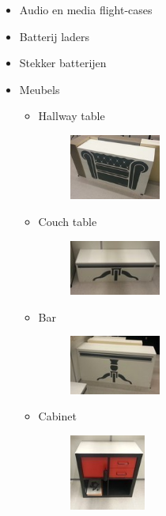 \documentclass[a4paper,10pt]{article}
\numberwithin{equation}{section}
\numberwithin{figure}{section}
\numberwithin{table}{section}
\begin{document}
\begin{itemize}
	\item Audio en media flight-cases
	\item Batterij laders
	\item Stekker batterijen
	\item Meubels
		\begin{itemize}
			\item Hallway table
			
				\begin{figure}[H]
					\centering
					\includegraphics[width=0.3\textwidth]{hallwaytable}
				\end{figure}
			
			\item Couch table
				\begin{figure}[H]
					\centering
					\includegraphics[width=0.3\textwidth]{couchtable}
				\end{figure}			
			
			\item Bar
				\begin{figure}[H]
					\centering
					\includegraphics[width=0.3\textwidth]{bar}
				\end{figure}			
			
			\item Cabinet
					\begin{figure}[H]
						\centering
						\includegraphics[width=0.25\textwidth]{cabinet}
					\end{figure}	
			

\end{itemize}
\end{itemize}
\end{document}
